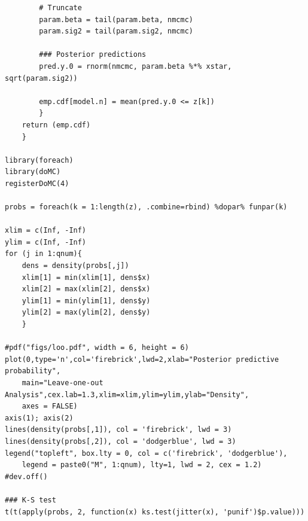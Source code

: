 \documentclass{asaproc}
\begin{document}
\begin{scriptsize}
\begin{verbatim}
        # Truncate
        param.beta = tail(param.beta, nmcmc)
        param.sig2 = tail(param.sig2, nmcmc)

        ### Posterior predictions
        pred.y.0 = rnorm(nmcmc, param.beta %*% xstar, sqrt(param.sig2))

        emp.cdf[model.n] = mean(pred.y.0 <= z[k])
        }
    return (emp.cdf)
    }

library(foreach)
library(doMC)
registerDoMC(4)

probs = foreach(k = 1:length(z), .combine=rbind) %dopar% funpar(k)

xlim = c(Inf, -Inf)
ylim = c(Inf, -Inf)
for (j in 1:qnum){
    dens = density(probs[,j])
    xlim[1] = min(xlim[1], dens$x)
    xlim[2] = max(xlim[2], dens$x)
    ylim[1] = min(ylim[1], dens$y)
    ylim[2] = max(ylim[2], dens$y)
    }

#pdf("figs/loo.pdf", width = 6, height = 6)
plot(0,type='n',col='firebrick',lwd=2,xlab="Posterior predictive probability",
    main="Leave-one-out Analysis",cex.lab=1.3,xlim=xlim,ylim=ylim,ylab="Density",
    axes = FALSE)
axis(1); axis(2)
lines(density(probs[,1]), col = 'firebrick', lwd = 3)
lines(density(probs[,2]), col = 'dodgerblue', lwd = 3)
legend("topleft", box.lty = 0, col = c('firebrick', 'dodgerblue'),
    legend = paste0("M", 1:qnum), lty=1, lwd = 2, cex = 1.2)
#dev.off()

### K-S test
t(t(apply(probs, 2, function(x) ks.test(jitter(x), 'punif')$p.value)))
\end{verbatim}
\end{scriptsize}
\end{document}
